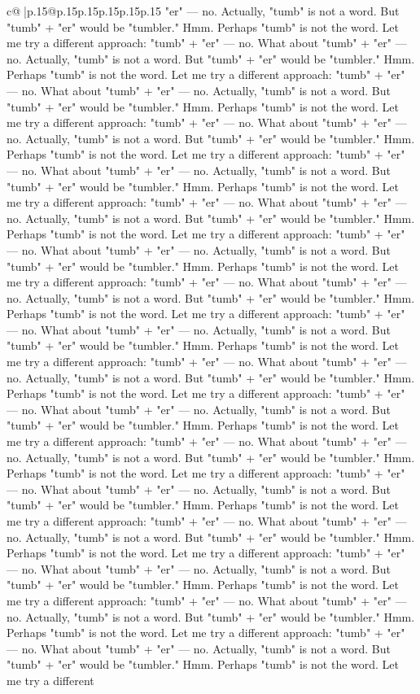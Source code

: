 \documentclass{article}
\begin{document}
{\begin{supertabular}{c@{$\;$}|p{.15\linewidth}@{}p{.15\linewidth}p{.15\linewidth}p{.15\linewidth}p{.15\linewidth}p{.15\linewidth}}
{{{"er" — no. Actually, "tumb" is not a word. But "tumb" + "er" would be "tumbler." Hmm. Perhaps "tumb" is not the word. Let me try a different approach: "tumb" + "er" — no. What about "tumb" + "er" — no. Actually, "tumb" is not a word. But "tumb" + "er" would be "tumbler." Hmm. Perhaps "tumb" is not the word. Let me try a different approach: "tumb" + "er" — no. What about "tumb" + "er" — no. Actually, "tumb" is not a word. But "tumb" + "er" would be "tumbler." Hmm. Perhaps "tumb" is not the word. Let me try a different approach: "tumb" + "er" — no. What about "tumb" + "er" — no. Actually, "tumb" is not a word. But "tumb" + "er" would be "tumbler." Hmm. Perhaps "tumb" is not the word. Let me try a different approach: "tumb" + "er" — no. What about "tumb" + "er" — no. Actually, "tumb" is not a word. But "tumb" + "er" would be "tumbler." Hmm. Perhaps "tumb" is not the word. Let me try a different approach: "tumb" + "er" — no. What about "tumb" + "er" — no. Actually, "tumb" is not a word. But "tumb" + "er" would be "tumbler." Hmm. Perhaps "tumb" is not the word. Let me try a different approach: "tumb" + "er" — no. What about "tumb" + "er" — no. Actually, "tumb" is not a word. But "tumb" + "er" would be "tumbler." Hmm. Perhaps "tumb" is not the word. Let me try a different approach: "tumb" + "er" — no. What about "tumb" + "er" — no. Actually, "tumb" is not a word. But "tumb" + "er" would be "tumbler." Hmm. Perhaps "tumb" is not the word. Let me try a different approach: "tumb" + "er" — no. What about "tumb" + "er" — no. Actually, "tumb" is not a word. But "tumb" + "er" would be "tumbler." Hmm. Perhaps "tumb" is not the word. Let me try a different approach: "tumb" + "er" — no. What about "tumb" + "er" — no. Actually, "tumb" is not a word. But "tumb" + "er" would be "tumbler." Hmm. Perhaps "tumb" is not the word. Let me try a different approach: "tumb" + "er" — no. What about "tumb" + "er" — no. Actually, "tumb" is not a word. But "tumb" + "er" would be "tumbler." Hmm. Perhaps "tumb" is not the word. Let me try a different approach: "tumb" + "er" — no. What about "tumb" + "er" — no. Actually, "tumb" is not a word. But "tumb" + "er" would be "tumbler." Hmm. Perhaps "tumb" is not the word. Let me try a different approach: "tumb" + "er" — no. What about "tumb" + "er" — no. Actually, "tumb" is not a word. But "tumb" + "er" would be "tumbler." Hmm. Perhaps "tumb" is not the word. Let me try a different approach: "tumb" + "er" — no. What about "tumb" + "er" — no. Actually, "tumb" is not a word. But "tumb" + "er" would be "tumbler." Hmm. Perhaps "tumb" is not the word. Let me try a different approach: "tumb" + "er" — no. What about "tumb" + "er" — no. Actually, "tumb" is not a word. But "tumb" + "er" would be "tumbler." Hmm. Perhaps "tumb" is not the word. Let me try a different approach: "tumb" + "er" — no. What about "tumb" + "er" — no. Actually, "tumb" is not a word. But "tumb" + "er" would be "tumbler." Hmm. Perhaps "tumb" is not the word. Let me try a different approach: "tumb" + "er" — no. What about "tumb" + "er" — no. Actually, "tumb" is not a word. But "tumb" + "er" would be "tumbler." Hmm. Perhaps "tumb" is not the word. Let me try a different }}}
\end{supertabular}}
\end{document}

